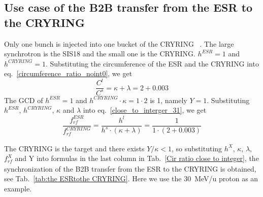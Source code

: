 \subsection{Use case of the B2B transfer from the ESR to the CRYRING}
Only one bunch is injected into one bucket of the CRYRING ~\cite{herfurth_low_2013, lestinsky_cryring_2015}. The large synchrotron is the SIS18 and the small one is the CRYRING. $h^{\mathit{ESR}}=1$ and $h^{\mathit{CRYRING}}=1$. Substituting the circumference of the ESR and the CRYRING into eq.~\ref{circumference_ratio_noint0}, we get
\begin{equation}
\frac{C^l}{C^s}=\kappa + \lambda =2+0.003
\end{equation}
The GCD of $h^{\mathit{ESR}}=1$ and $h^{\mathit{CRYRING}} \cdot \kappa=1\cdot 2$ is 1, namely $Y=1$. Substituting $h^{\mathit{ESR}}$, $h^{\mathit{CRYRING}}$, $\kappa$ and $\lambda$ into eq.~\ref{close_to_interger_31}, we get
\begin{equation}
\frac {f_{\mathit{rf}}^{\mathit{ESR}}}{f_{\mathit{rf}}^{\mathit{CRYRING}}}= \frac{h^l}{h^s \cdot (\kappa+ \lambda)}=\frac {1}{1 \cdot(2+0.003)}
\end{equation}

The CRYRING is the target and there exists $Y/\kappa<1$, so substituting $h^X$, $\kappa$, $\lambda$, $f_{\mathit{rf}}^{X}$ and Y into formulas in the last column in Tab.~\ref{Cir ratio close to integer}, the synchronization of the B2B transfer from the ESR to the CRYRING is obtained, see Tab.~\ref{tab:the ESRtothe CRYRING}. Here we use the \SI{30}{MeV/\atomicmassunit} proton as an example. 

